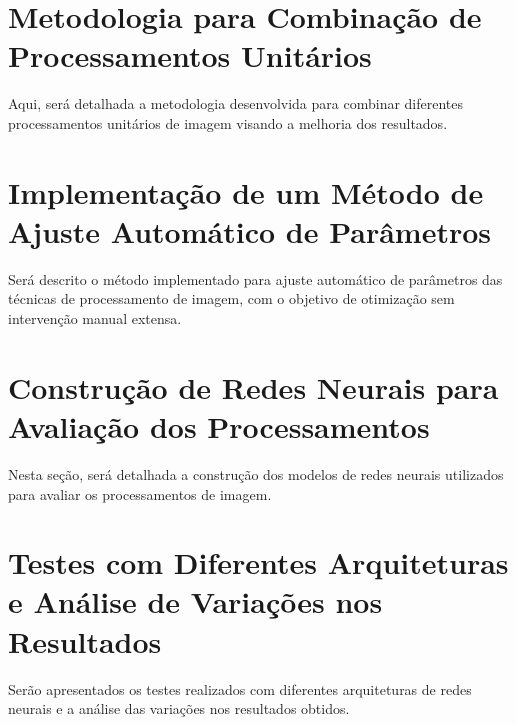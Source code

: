 \section{Metodologia para Combinação de Processamentos Unitários}
Aqui, será detalhada a metodologia desenvolvida para combinar diferentes processamentos unitários de imagem visando a melhoria dos resultados.

\section{Implementação de um Método de Ajuste Automático de Parâmetros}
Será descrito o método implementado para ajuste automático de parâmetros das técnicas de processamento de imagem, com o objetivo de otimização sem intervenção manual extensa.

\section{Construção de Redes Neurais para Avaliação dos Processamentos}
Nesta seção, será detalhada a construção dos modelos de redes neurais utilizados para avaliar os processamentos de imagem.

\section{Testes com Diferentes Arquiteturas e Análise de Variações nos Resultados}
Serão apresentados os testes realizados com diferentes arquiteturas de redes neurais e a análise das variações nos resultados obtidos.
